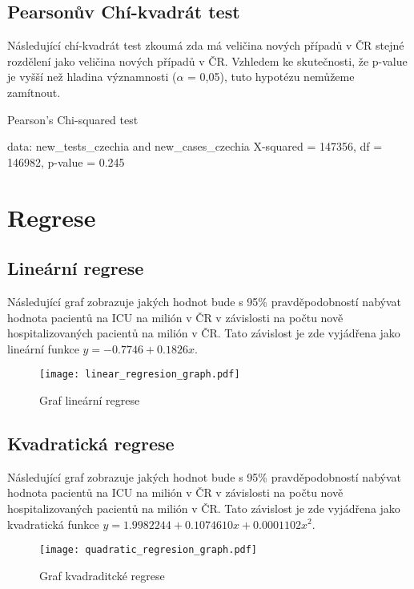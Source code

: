 \documentclass[a4paper, 12pt]{article}
\begin{document}
\subsection{Pearsonův Chí-kvadrát test}

Následující chí-kvadrát test zkoumá zda má veličina nových případů v ČR stejné
rozdělení jako veličina nových případů v ČR. Vzhledem ke skutečnosti, že p-value je vyšší
než hladina významnosti ($\alpha$ = 0,05), tuto hypotézu nemůžeme zamítnout.

\begin{Schunk}
\begin{Soutput}
	Pearson's Chi-squared test

data:  new_tests_czechia and new_cases_czechia
X-squared = 147356, df = 146982, p-value = 0.245
\end{Soutput}
\end{Schunk}

\section{Regrese}
\subsection{Lineární regrese}

Následující graf zobrazuje jakých hodnot bude s 95\% pravděpodobností nabývat
hodnota pacientů na ICU na milión v ČR v závislosti na počtu nově hospitalizovaných
pacientů na milión v ČR. Tato závislost je zde vyjádřena jako lineární funkce $y = -0.7746 + 0.1826x$.

\begin{figure}[H]
\centering
\texttt{[image: linear\_regresion\_graph.pdf]}
\caption{Graf lineární regrese}

\end{figure}

\clearpage

\subsection{Kvadratická regrese}

Následující graf zobrazuje jakých hodnot bude s 95\% pravděpodobností nabývat
hodnota pacientů na ICU na milión v ČR v závislosti na počtu nově hospitalizovaných
pacientů na milión v ČR. Tato závislost je zde vyjádřena jako kvadratická funkce $y = 1.9982244 + 0.1074610x + 0.0001102x^2$.

\begin{figure}[H]
\centering
\texttt{[image: quadratic\_regresion\_graph.pdf]}
\caption{Graf kvadraditcké regrese}

\end{figure}
\end{document}
